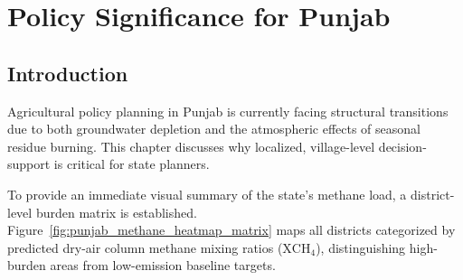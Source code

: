 \documentclass[12pt,a4paper]{report}
\begin{document}
\chapter{Policy Significance for Punjab}
\label{ch:policy_sig}

\section{Introduction}
Agricultural policy planning in Punjab is currently facing structural transitions due to both groundwater depletion and the atmospheric effects of seasonal residue burning. This chapter discusses why localized, village-level decision-support is critical for state planners.

To provide an immediate visual summary of the state's methane load, a district-level burden matrix is established. Figure~\ref{fig:punjab_methane_heatmap_matrix} maps all districts categorized by predicted dry-air column methane mixing ratios ($\text{XCH}_4$), distinguishing high-burden areas from low-emission baseline targets.
\end{document}

